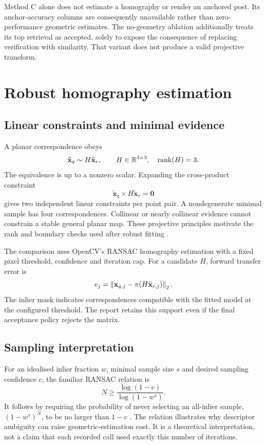 Method C alone does not estimate a homography or render an anchored post. Its anchor-accuracy columns are consequently unavailable rather than zero-performance geometric estimates. The no-geometry ablation additionally treats its top retrieval as accepted, solely to expose the consequence of replacing verification with similarity. That variant does not produce a valid projective transform.

\section{Robust homography estimation}
\subsection{Linear constraints and minimal evidence}
A planar correspondence obeys
\begin{equation}
 \widetilde{\mathbf x}_q \sim H\widetilde{\mathbf x}_r,
 \qquad H\in\mathbb{R}^{3\times3},\quad \operatorname{rank}(H)=3.
\end{equation}
The equivalence is up to a nonzero scalar. Expanding the cross-product constraint
\begin{equation}
 \widetilde{\mathbf x}_q\times H\widetilde{\mathbf x}_r=\mathbf0
\end{equation}
gives two independent linear constraints per point pair. A nondegenerate minimal sample has four correspondences. Collinear or nearly collinear evidence cannot constrain a stable general planar map. These projective principles motivate the rank and boundary checks used after robust fitting \citep{hartley2004}.

The comparison uses OpenCV's RANSAC homography estimation with a fixed pixel threshold, confidence and iteration cap. For a candidate $H$, forward transfer error is
\begin{equation}
 e_j=\left\lVert\mathbf x_{q,j}-\pi(H\widetilde{\mathbf x}_{r,j})\right\rVert_2.
\end{equation}
The inlier mask indicates correspondences compatible with the fitted model at the configured threshold. The report retains this support even if the final acceptance policy rejects the matrix.

\subsection{Sampling interpretation}
For an idealised inlier fraction $w$, minimal sample size $s$ and desired sampling confidence $c$, the familiar RANSAC relation is
\begin{equation}\label{eq:ransac-iterations}
 N\geq\frac{\log(1-c)}{\log(1-w^s)}.
\end{equation}
It follows by requiring the probability of never selecting an all-inlier sample, $(1-w^s)^N$, to be no larger than $1-c$ \citep{fischler1981}. The relation illustrates why descriptor ambiguity can raise geometric-estimation cost. It is a theoretical interpretation, not a claim that each recorded call used exactly this number of iterations.

